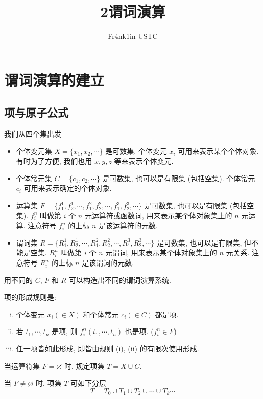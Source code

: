 \documentclass[
    mode=hazy,
    color=blue,
    device=normal,
    lang=cn
]{elegantnote}
\title{2\hspace{.5cm}谓词演算}
\author{Fr4nk1in-USTC}
\institute{中国科学技术大学计算机学院}
\date{\zhtoday}
\begin{document}
    \setlength\abovedisplayskip{.125em}
    \setlength\belowdisplayskip{.125em}
    \maketitle
    \section{谓词演算的建立}
    \subsection{项与原子公式}
    我们从四个集出发
    \begin{itemize}[listparindent = 2em]
        \item 个体变元集 $X=\{x_1, x_2, \cdots\}$ 是可数集. 个体变元 $x_i$ 可用来表示某个个体对象. 有时为了方便, 我们也用 $x, y, z$ 等来表示个体变元.
        \item 个体常元集 $C=\{c_1, c_2, \cdots\}$ 是可数集, 也可以是有限集 (包括空集). 个体常元 $c_i$ 可用来表示确定的个体对象.
        \item 运算集 $F=\{f_1^1, f_2^1, \cdots, f_1^2, f_2^2, \cdots, f_1^3, f_2^3, \cdots\}$ 是可数集, 也可以是有限集 (包括空集).
        $f_i^n$ 叫做第 $i$ 个 $n$ 元运算符或函数词, 用来表示某个体对象集上的 $n$ 元运算. 注意符号 $f_i^n$ 的上标 $n$ 是该运算符的元数.
        \item 谓词集 $R=\{R_1^1, R_2^1, \cdots, R_1^2, R_2^2, \cdots, R_1^3, R_2^3, \cdots\}$ 是可数集, 也可以是有限集, 但不能是空集. 
        $R_i^n$ 叫做第 $i$ 个 $n$ 元谓词, 用来表示某个体对象集上的 $n$ 元关系. 注意符号 $R_i^n$ 的上标 $n$ 是该谓词的元数.
    \end{itemize}
    用不同的 $C$, $F$ 和 $R$ 可以构造出不同的谓词演算系统.
    \begin{definition}[项集 $T$]
        项的形成规则是:
        \begin{enumerate}[(i)]
            \item 个体变元 $x_i (\in X)$ 和个体常元 $c_i (\in C)$ 都是项.
            \item 若 $t_1, \cdots, t_n$ 是项, 则 $f_i^n(t_1, \cdots, t_n)$ 也是项. ($f_i^n\in F$)
            \item 任一项皆如此形成, 即皆由规则 (i), (ii) 的有限次使用形成.
        \end{enumerate}
        当运算符集 $F=\varnothing$ 时, 规定项集 $T=X\cup C$.
    \end{definition}
    当 $F\neq \varnothing$ 时, 项集 $T$ 可如下分层
    $$
        T=T_0\cup T_1\cup T_2\cup \cdots\cup T_k\cdots
    $$
\end{document}
